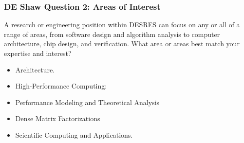 \begin{frame} 
\frametitle{DE Shaw Question 2: Areas of Interest} 
{\tiny A research or engineering position within DESRES can focus on
  any or all of a range of areas, from software design and algorithm
  analysis to computer architecture, chip design, and
  verification. What area or areas best match your expertise and
  interest?} 

\begin{itemize} 

\tiny \item \tiny Architecture. 
\item \tiny High-Performance Computing: 
\item \tiny Performance Modeling and Theoretical Analysis
\item \tiny Dense Matrix Factorizations 
\item \tiny Scientific Computing and Applications. 

\end{itemize} 

\end{frame} 
